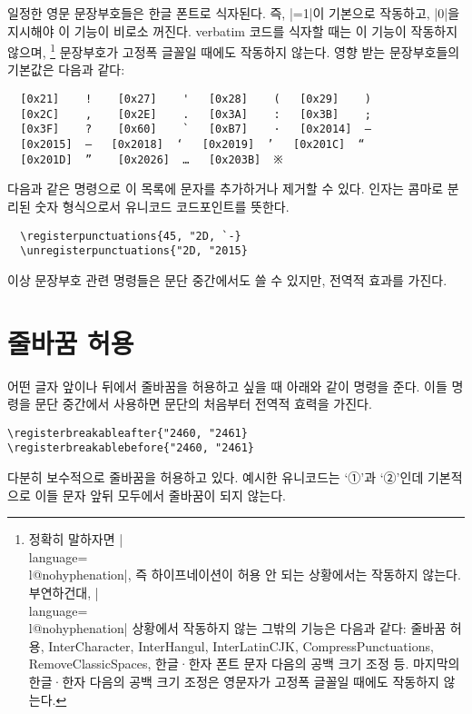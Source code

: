 \documentclass[a4paper]{article}
\def\luatex{\hologo{LuaTeX}}
\def\logoko{\textsf{k}\kern-.0625em\textit{o}}
\def\luatexko{\luatex-\logoko}
\begin{document}
일정한 영문 문장부호들은 한글 폰트로 식자된다.
즉, \pkgkwd{\hangulpunctuations}|=1|이 기본으로 작동하고,
|0|을 지시해야 이 기능이 비로소 꺼진다.
verbatim 코드를 식자할 때는 이 기능이 작동하지 않으며,%
\footnote{%
  정확히 말하자면 |\\language=\\l@nohyphenation|, 즉 하이프네이션이
  허용 안 되는  상황에서는 작동하지 않는다.
  부연하건대, |\\language=\\l@nohyphenation| 상황에서 작동하지 않는
  그밖의 기능은 다음과 같다: 줄바꿈 허용, InterCharacter, InterHangul,
  InterLatinCJK, CompressPunctuations, RemoveClassicSpaces,
  한글^^b7한자 폰트 문자 다음의 공백 크기 조정 등. 마지막의
  한글^^b7한자 다음의 공백 크기 조정은 영문자가 고정폭 글꼴일 때에도
  작동하지 않는다. }
문장부호가 고정폭 글꼴일 때에도 작동하지 않는다.
영향 받는 문장부호들의 기본값은 다음과 같다:
\begin{verbatim}
  [0x21]    !    [0x27]    '   [0x28]    (   [0x29]    )
  [0x2C]    ,    [0x2E]    .   [0x3A]    :   [0x3B]    ;
  [0x3F]    ?    [0x60]    `   [0xB7]    ·   [0x2014]  —
  [0x2015]  ―   [0x2018]  ‘   [0x2019]  ’   [0x201C]  “
  [0x201D]  ”    [0x2026]  …   [0x203B]  ※
\end{verbatim}
다음과 같은 명령으로 이 목록에 문자를 추가하거나 제거할 수 있다.%
\pkgkwd*{\registerpunctuations}%
\pkgkwd*{\unregisterpunctuations}
인자는 콤마로 분리된 숫자 형식으로서 유니코드 코드포인트를 뜻한다.
\begin{verbatim}
  \registerpunctuations{45, "2D, `-}
  \unregisterpunctuations{"2D, "2015}
\end{verbatim}
이상 문장부호 관련 명령들은 문단 중간에서도 쓸 수 있지만, 전역적 효과를 가진다.

\section{줄바꿈 허용}\label{sec:break}

어떤 글자 앞이나 뒤에서 줄바꿈을 허용하고 싶을 때 아래와 같이 명령을 준다.%
\pkgkwd*{\registerbreakableafter}%
\pkgkwd*{\registerbreakablebefore}
이들 명령을 문단 중간에서 사용하면 문단의 처음부터 전역적 효력을 가진다.
\begin{verbatim}
\registerbreakableafter{"2460, "2461}
\registerbreakablebefore{"2460, "2461}
\end{verbatim}
 다분히 보수적으로 줄바꿈을 허용하고 있다.
예시한 유니코드는 `①'과 `②'인데 기본적으로
이들 문자 앞뒤 모두에서 줄바꿈이 되지 않는다.
\end{document}
